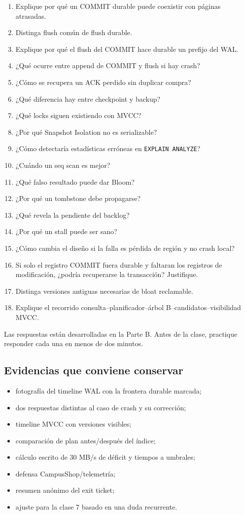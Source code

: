 \documentclass[variant=docente,cover=institutional,mode=screen]{ua-engineering-v6-article}
\begin{document}
\begin{enumerate}
\item Explique por qué un COMMIT durable puede coexistir con páginas atrasadas.
\item Distinga flush común de flush durable.
\item Explique por qué el flush del COMMIT hace durable un prefijo del WAL.
\item ¿Qué ocurre entre append de COMMIT y flush si hay crash?
\item ¿Cómo se recupera un ACK perdido sin duplicar compra?
\item ¿Qué diferencia hay entre checkpoint y backup?
\item ¿Qué locks siguen existiendo con MVCC?
\item ¿Por qué Snapshot Isolation no es serializable?
\item ¿Cómo detectaría estadísticas erróneas en \texttt{EXPLAIN ANALYZE}?
\item ¿Cuándo un seq scan es mejor?
\item ¿Qué falso resultado puede dar Bloom?
\item ¿Por qué un tombstone debe propagarse?
\item ¿Qué revela la pendiente del backlog?
\item ¿Por qué un stall puede ser sano?
\item ¿Cómo cambia el diseño si la falla es pérdida de región y no crash local?
\item Si solo el registro COMMIT fuera durable y faltaran los registros de modificación, ¿podría recuperarse la transacción? Justifique.
\item Distinga versiones antiguas necesarias de bloat reclamable.
\item Explique el recorrido consulta--planificador--árbol B--candidatos--visibilidad MVCC.
\end{enumerate}

Las respuestas están desarrolladas en la Parte B. Antes de la clase, practique responder cada una en menos de dos minutos.

\subsection{Evidencias que conviene conservar}

\begin{itemize}
\item fotografía del timeline WAL con la frontera durable marcada;
\item dos respuestas distintas al caso de crash y su corrección;
\item timeline MVCC con versiones visibles;
\item comparación de plan antes/después del índice;
\item cálculo escrito de 30 MB/s de déficit y tiempos a umbrales;
\item defensa CampusShop/telemetría;
\item resumen anónimo del exit ticket;
\item ajuste para la clase 7 basado en una duda recurrente.
\end{itemize}
\end{document}
